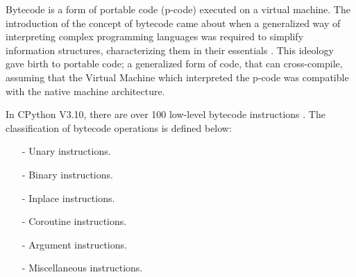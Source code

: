 {			\par Bytecode is a form of portable code (p-code) executed on a virtual machine. 
			The introduction of the concept of bytecode came about when a generalized way 
			 of interpreting complex programming languages was required to simplify information structures, characterizing them in their essentials \cite[]{landin1964mechanical}.
			 This ideology gave birth to portable code; a generalized form of code, that can cross-compile, assuming that
			 the Virtual Machine which interpreted the p-code was compatible with the native machine architecture. 
			 \par In CPython V3.10, there are over 100 low-level bytecode instructions \cite[]{pythonofficial2022docsdismodule}. The classification of bytecode operations is defined below:
			\begin{itemize}
				\item[-]Unary instructions.
				\item[-] Binary instructions.
				\item[-] Inplace instructions.
				\item[-] Coroutine instructions.
				\item[-] Argument instructions.
				\item[-] Miscellaneous instructions.
			\end{itemize}
			
}

